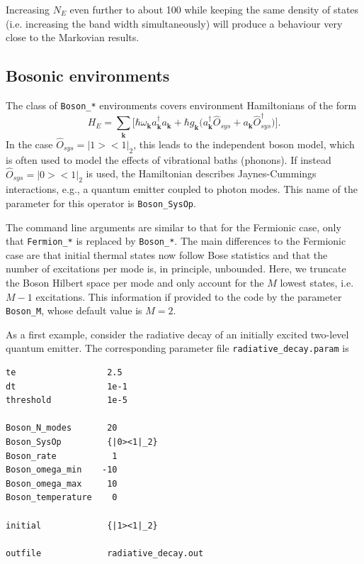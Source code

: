 \documentclass{scrartcl}
\begin{document}
Increasing $N_E$ even further to about 100 while keeping the same density of 
states (i.e. increasing the band width simultaneously) will produce a behaviour
very close to the Markovian results.


\subsection{Bosonic environments}
The class of \verb+Boson_*+ environments covers environment 
Hamiltonians of the form
\begin{equation}
H_E=
\sum_{\mathbf{k}} \bigg[\hbar\omega_\mathbf{k}a^\dagger_\mathbf{k}a_\mathbf{k}
+ \hbar g_\mathbf{k}\big(a^\dagger_\mathbf{k} \hat{O}_{sys}
+a_\mathbf{k} \hat{O}_{sys}^\dagger\big) \bigg].
\end{equation}
In the case $\hat{O}_{sys}=|1><1|_2$, this leads to the independent boson model,
which is often used to model the effects of vibrational baths (phonons).
If instead $\hat{O}_{sys}=|0><1|_2$ is used, the Hamiltonian describes 
Jaynes-Cummings interactions, e.g., a quantum emitter coupled to
photon modes. This name of the parameter for this operator is 
\verb+Boson_SysOp+.

The command line arguments are similar to that for the Fermionic case, only 
that \verb+Fermion_*+ is replaced by \verb+Boson_*+.
The main differences to the Fermionic case are that initial thermal states 
now follow Bose statistics and that the number of 
excitations per mode is, in principle, unbounded. Here, we truncate the
Boson Hilbert space per mode and only account for the $M$ lowest states,
i.e. $M-1$ excitations. This information if provided to the code by the
parameter \verb+Boson_M+, whose default value is $M=2$. 

As a first example, consider the radiative decay of an initially excited
two-level quantum emitter. The corresponding parameter file 
\verb+radiative_decay.param+ is


\noindent\makebox[5cm]{\rule{7cm}{0.4pt}}
\begin{verbatim}
te                  2.5
dt                  1e-1
threshold           1e-5

Boson_N_modes       20
Boson_SysOp         {|0><1|_2}
Boson_rate           1 
Boson_omega_min    -10 
Boson_omega_max     10
Boson_temperature    0

initial             {|1><1|_2}

outfile             radiative_decay.out
\end{verbatim}
\noindent\makebox[5cm]{\rule{7cm}{0.4pt}}
\end{document}
